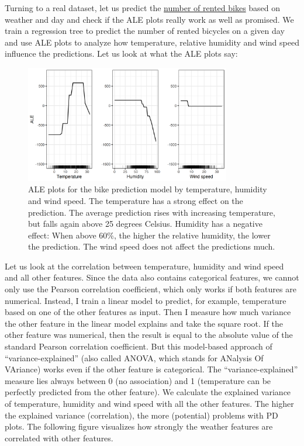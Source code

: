 \documentclass[
  11pt,
]{scrbook}
\begin{document}
Turning to a real dataset, let us predict the \protect\hyperlink{bike-data}{number of rented bikes} based on weather and day and check if the ALE plots really work as well as promised.
We train a regression tree to predict the number of rented bicycles on a given day and use ALE plots to analyze how temperature, relative humidity and wind speed influence the predictions.
Let us look at what the ALE plots say:

\begin{figure}

{\centering \includegraphics[width=0.8\textwidth]{images/ale-bike-1} 

}

\caption{ALE plots for the bike prediction model by temperature, humidity and wind speed. The temperature has a strong effect on the prediction. The average prediction rises with increasing temperature, but falls again above 25 degrees Celsius. Humidity has a negative effect: When above 60\%, the higher the relative humidity, the lower the prediction. The wind speed does not affect the predictions much.}\label{fig:ale-bike}
\end{figure}

Let us look at the correlation between temperature, humidity and wind speed and all other features.
Since the data also contains categorical features, we cannot only use the Pearson correlation coefficient, which only works if both features are numerical.
Instead, I train a linear model to predict, for example, temperature based on one of the other features as input.
Then I measure how much variance the other feature in the linear model explains and take the square root.
If the other feature was numerical, then the result is equal to the absolute value of the standard Pearson correlation coefficient.
But this model-based approach of ``variance-explained'' (also called ANOVA, which stands for ANalysis Of VAriance) works even if the other feature is categorical.
The ``variance-explained'' measure lies always between 0 (no association) and 1 (temperature can be perfectly predicted from the other feature).
We calculate the explained variance of temperature, humidity and wind speed with all the other features.
The higher the explained variance (correlation), the more (potential) problems with PD plots.
The following figure visualizes how strongly the weather features are correlated with other features.
\end{document}
